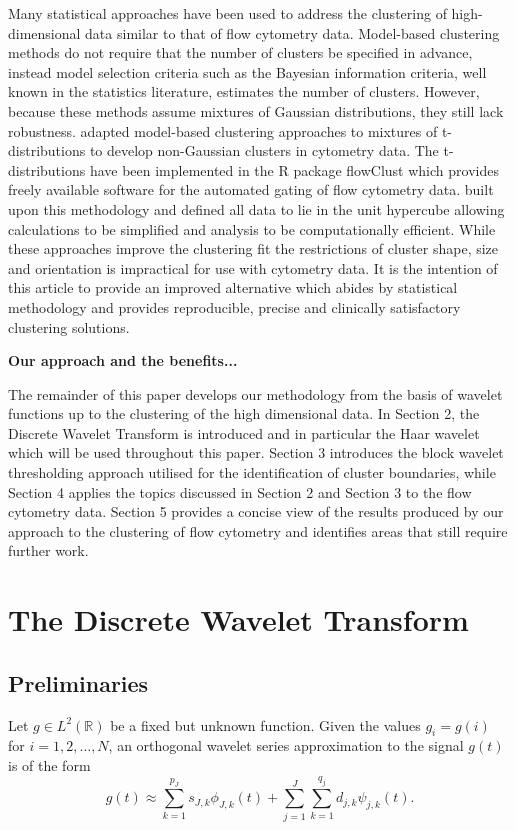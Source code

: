 \documentclass[a4paper, 12pt]{article}
\begin{document}
Many statistical approaches have been used to address the clustering of high-dimensional data similar to that of flow cytometry data. Model-based clustering methods do not require that the number of clusters be specified in advance, instead model selection criteria such as the Bayesian information criteria, well known in the statistics literature, estimates the number of clusters. However, because these methods assume mixtures of Gaussian distributions, they still lack robustness. \cite{tmixtures} adapted model-based clustering approaches to mixtures of t-distributions to develop non-Gaussian clusters in cytometry data. The t-distributions have been implemented in the R package flowClust which provides freely available software for the automated gating of flow cytometry data. \cite{nugentdean} built upon this methodology and defined all data to lie in the unit hypercube allowing calculations to be simplified and analysis to be computationally efficient. While these approaches improve the clustering fit the restrictions of cluster shape, size and orientation is impractical for use with cytometry data. It is the intention of this article to provide an improved alternative which abides by statistical methodology and provides reproducible, precise and clinically satisfactory clustering solutions.

\medskip

\textbf{Our approach and the benefits...}

\medskip
The remainder of this paper develops our methodology from the basis of wavelet functions up to the clustering of the high dimensional data. In Section 2, the Discrete Wavelet Transform is introduced and in particular the Haar wavelet which will be used throughout this paper. Section 3 introduces the block wavelet thresholding approach utilised for the identification of cluster boundaries, while Section 4 applies the topics discussed in Section 2 and Section 3 to the flow cytometry data. Section 5 provides a concise view of the results produced by our approach to the clustering of flow cytometry and identifies areas that still require further work.

\newpage
\section{The Discrete Wavelet Transform}
\subsection{Preliminaries}
Let $g \in L^2(\mathbb{R})$ be a fixed but unknown function. Given the values $g_i=g(i)$ for $i=1,2, \ldots, N$, an orthogonal wavelet series approximation to the signal $g(t)$ is of the form
\begin{equation}
g(t) \approx \sum_{k=1}^{p_{J}} s_{J,k} \phi_{J,k}(t) + \sum_{j=1}^J\sum_{k=1}^{q_{j}} d_{j,k}\psi_{j,k}(t).
\label{eq:dwt1d}
\end{equation}
\end{document}
